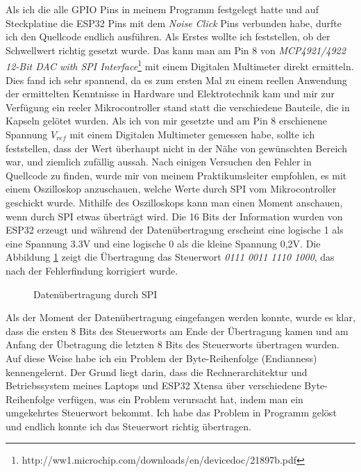 Als ich die alle GPIO Pins in meinem Programm festgelegt hatte und auf Steckplatine die ESP32 Pins mit dem \textit{Noise Click} Pins verbunden habe, durfte ich den Quellcode endlich ausführen. 
Als Erstes wollte ich feststellen, ob der Schwellwert richtig gesetzt wurde. Das kann man am Pin 8 von  \textit{MCP4921/4922 12-Bit DAC with SPI Interface}\footnote{http://ww1.microchip.com/downloads/en/devicedoc/21897b.pdf} mit einem Digitalen Multimeter direkt ermitteln. Dies fand ich sehr spannend, da es zum ersten Mal zu einem reellen Anwendung der ermittelten Kenntnisse in Hardware und Elektrotechnik kam und mir zur Verfügung ein reeler Mikrocontroller stand statt die verschiedene Bauteile, die in Kapseln gelötet wurden. Als ich von mir gesetzte und am Pin 8 erschienene Spannung $V_{ref}$ mit einem Digitalen Multimeter gemessen habe, sollte ich feststellen, dass der Wert überhaupt nicht in der Nähe von gewünschten Bereich war, und ziemlich zufällig aussah. Nach einigen Versuchen den Fehler in Quellcode zu finden, wurde mir von meinem Praktikumsleiter empfohlen, es mit einem Oszilloskop anzuschauen, welche Werte durch SPI vom Mikrocontroller geschickt wurde. Mithilfe des Oszilloskops kann man einen Moment anschauen, wenn durch SPI etwas überträgt wird. Die 16 Bits der Information wurden von ESP32 erzeugt und während der Datenübertragung erscheint eine logische 1 als eine Spannung 3.3V und eine logische 0 als die kleine Spannung 0,2V. Die Abbildung \ref{fig:spi_transfer} zeigt die Übertragung das Steuerwort \textit{0111 0011 1110 1000}, das nach der Fehlerfindung korrigiert wurde. 
\begin{figure}[!hb]
	\centering
	\caption{Datenübertragung durch SPI}
	\label{fig:spi_transfer}
\end{figure}

Als der Moment der Datenübertragung eingefangen werden konnte, wurde es klar, dass die ersten 8 Bits des Steuerworts am Ende der Übertragung kamen und am Anfang der Übetragung die letzten 8 Bits des Steuerworts übertragen wurden. Auf diese Weise habe ich ein Problem der Byte-Reihenfolge (Endianness) kennengelernt. Der Grund liegt darin, dass die Rechnerarchitektur und Betriebssystem meines Laptops und ESP32 Xtensa über verschiedene Byte-Reihenfolge verfügen, was ein Problem verursacht hat, indem man ein umgekehrtes Steuerwort bekommt. Ich habe das Problem in Programm gelöst und endlich konnte ich das Steuerwort richtig übertragen. 

